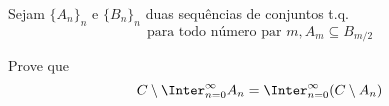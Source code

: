 \begin{exercise}
    Sejam $\{A_n\}_n$ e $\{B_n\}_n$ duas sequências de conjuntos t.q.
    $$ \text{para todo número par } m, A_m \subseteq B_{m/2} $$
\end{exercise}

\begin{exercise}
    Prove que 
    $$
    C \setminus \Inter_{n = 0}^\infty A_n = 
    \Inter_{n = 0}^\infty (C \setminus A_n)
    $$
\end{exercise}
